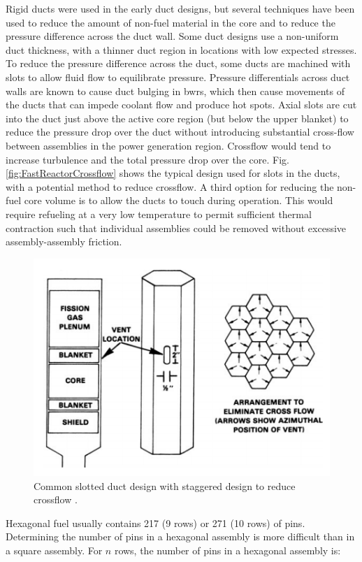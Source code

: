 \documentclass[10pt]{article}
\numberwithin{equation}{section} %
\begin{document}
Rigid ducts were used in the early duct designs, but several techniques have been used to reduce the amount of non-fuel material in the core and to reduce the pressure difference across the duct wall. Some duct designs use a non-uniform duct thickness, with a thinner duct region in locations with low expected stresses. To reduce the pressure difference across the duct, some ducts are machined with slots to allow fluid flow to equilibrate pressure. Pressure differentials across duct walls are known to cause duct bulging in \gls{bwr}s, which then cause movements of the ducts that can impede coolant flow and produce hot spots. Axial slots are cut into the duct just above the active core region (but below the upper blanket) to reduce the pressure drop over the duct without introducing substantial cross-flow between assemblies in the power generation region. Crossflow would tend to increase turbulence and the total pressure drop over the core. Fig. \ref{fig:FastReactorCrossflow} shows the typical design used for slots in the ducts, with a potential method to reduce crossflow. A third option for reducing the non-fuel core volume is to allow the ducts to touch during operation. This would require refueling at a very low temperature to permit sufficient thermal contraction such that individual assemblies could be removed without excessive assembly-assembly friction. 

\begin{figure}[H]
\centering
\includegraphics[width=0.6\linewidth]{figures/FastReactorCrossflow.pdf}
\caption{Common slotted duct design with staggered design to reduce crossflow \cite{FastReactors}.}
\label{fig:FastReactorReactorCrossflow}
\end{figure}

Hexagonal fuel usually contains 217 (9 rows) or 271 (10 rows) of pins. Determining the number of pins in a hexagonal assembly is more difficult than in a square assembly. For \(n\) rows, the number of pins in a hexagonal assembly is:
\end{document}
